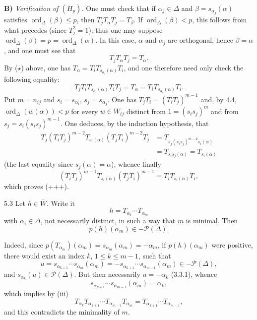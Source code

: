 \textbf{B)} \emph{Verification of $(H_p)$.}{\renewcommand{\thefootnote}{(22)}} One must check that if $\alpha_j\in\Delta$ and $\beta=s_{\alpha_j}(\alpha)$ satisfies $\operatorname{ord}_\Delta(\beta)\leq p$, then $T_jT_\alpha T_j=T_\beta$. If $\operatorname{ord}_\Delta(\beta)<p$, this follows from what precedes (since $T_j^2=1$); thus one may suppose $\operatorname{ord}_\Delta(\beta)=p=\operatorname{ord}_\Delta(\alpha)$. In this case, $\alpha$ and $\alpha_j$ are orthogonal, hence $\beta=\alpha$, and one must see that
\begin{equation}\tag{$\dagger$}\label{XXI.5.eq.dagger}
T_jT_\alpha T_j=T_\alpha.
\end{equation}
By ($\star$) above, one has $T_\alpha=T_iT_{s_{\alpha_i}(\alpha)}T_i$, and one therefore need only check the following equality:
\begin{equation}\tag{+++}\label{XXI.5.eq.plusplusplus}
T_jT_iT_{s_{\alpha_i}(\alpha)}T_iT_j=T_\alpha=T_iT_{s_{\alpha_i}(\alpha)}T_i.
\end{equation}
Put $m=n_{ij}$ and $s_i=s_{\alpha_i}$, $s_j=s_{\alpha_j}$. One has $T_jT_i=(T_iT_j)^{m-1}$ and, by 4.4, $\operatorname{ord}_\Delta(w(\alpha))<p$ for every $w\in W_{ij}$ distinct from $1=(s_is_j)^m$ and from $s_j=s_i(s_is_j)^{m-1}$. One deduces, by the induction hypothesis, that
\[
\begin{split}
T_j(T_iT_j)^{m-2}T_{s_i(\alpha)}(T_jT_i)^{m-2}T_j
&=T_{s_j(s_is_j)^{m-2}s_i(\alpha)}\\
&=T_{s_is_j(\alpha)}=T_{s_i(\alpha)}
\end{split}
\]
(the last equality since $s_j(\alpha)=\alpha$), whence finally
\[
(T_iT_j)^{m-1}T_{s_i(\alpha)}(T_jT_i)^{m-1}=T_iT_{s_i(\alpha)}T_i,
\]
which proves (+++).

\begin{lemma}{5.3}\label{XXI.5.3}
Let $h\in\overline W$. Write it
\[
h=T_{\alpha_1}\cdots T_{\alpha_m}
\]
with $\alpha_i\in\Delta$, not necessarily distinct, in such a way that $m$ is minimal. Then
\[
p(h)(\alpha_m)\in-\mathcal P(\Delta).
\]
\end{lemma}
Indeed, since $p(T_{\alpha_m})(\alpha_m)=s_{\alpha_m}(\alpha_m)=-\alpha_m$, if $p(h)(\alpha_m)$ were positive, there would exist an index $k$, $1\leq k\leq m-1$, such that
\[
u=s_{\alpha_{k+1}}\cdots s_{\alpha_m}(\alpha_m)=-s_{\alpha_{k+1}}\cdots s_{\alpha_{m-1}}(\alpha_m)\in-\mathcal P(\Delta),
\]
and $s_{\alpha_k}(u)\in\mathcal P(\Delta)$. But then necessarily $u=-\alpha_k$ (3.3.1), whence
\[
s_{\alpha_{k+1}}\cdots s_{\alpha_{m-1}}(\alpha_m)=\alpha_k,
\]
which implies by (iii)
\[
T_{\alpha_k}T_{\alpha_{k+1}}\cdots T_{\alpha_{m-1}}T_{\alpha_m}=T_{\alpha_{k+1}}\cdots T_{\alpha_{m-1}},
\]
and this contradicts the minimality of $m$.

